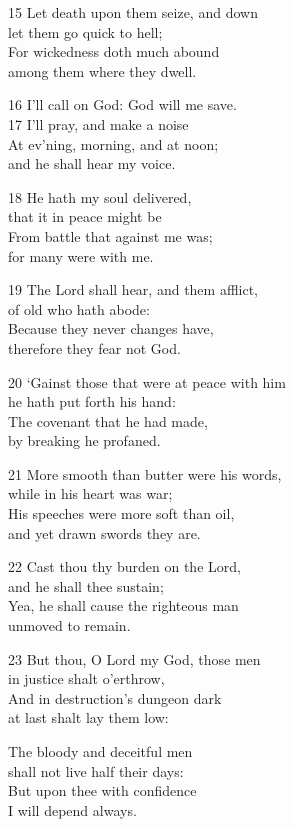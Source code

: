 15 Let death upon them seize, and down\\
let them go quick to hell;\\
For wickedness doth much abound\\
among them where they dwell.

16 I’ll call on God: God will me save.\\
17 I’ll pray, and make a noise\\
At ev’ning, morning, and at noon;\\
and he shall hear my voice.

18 He hath my soul delivered,\\
that it in peace might be\\
From battle that against me was;\\
for many were with me.

19 The Lord shall hear, and them afflict,\\
of old who hath abode:\\
Because they never changes have,\\
therefore they fear not God.

20 ‘Gainst those that were at peace with him\\
he hath put forth his hand:\\
The covenant that he had made,\\
by breaking he profaned.

21 More smooth than butter were his words,\\
while in his heart was war;\\
His speeches were more soft than oil,\\
and yet drawn swords they are.

22 Cast thou thy burden on the Lord,\\
and he shall thee sustain;\\
Yea, he shall cause the righteous man\\
unmoved to remain.

23 But thou, O Lord my God, those men\\
in justice shalt o’erthrow,\\
And in destruction’s dungeon dark\\
at last shalt lay them low:

The bloody and deceitful men\\
shall not live half their days:\\
But upon thee with confidence\\
I will depend always.

